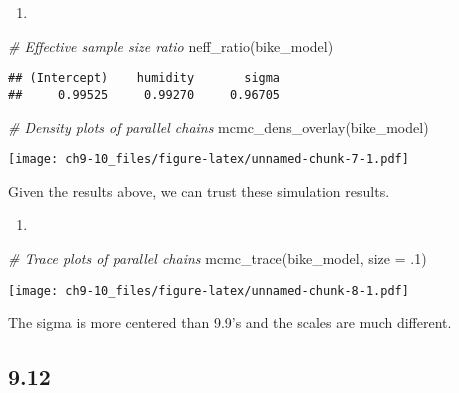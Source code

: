 \documentclass[
]{article}
\newenvironment{Shaded}{\begin{snugshade}}{\end{snugshade}}
\newcommand{\AttributeTok}[1]{\textcolor[rgb]{0.77,0.63,0.00}{#1}}
\newcommand{\CommentTok}[1]{\textcolor[rgb]{0.56,0.35,0.01}{\textit{#1}}}
\newcommand{\DecValTok}[1]{\textcolor[rgb]{0.00,0.00,0.81}{#1}}
\newcommand{\FunctionTok}[1]{\textcolor[rgb]{0.00,0.00,0.00}{#1}}
\newcommand{\NormalTok}[1]{#1}
\providecommand{\tightlist}{%
  \setlength{\itemsep}{0pt}\setlength{\parskip}{0pt}}
\begin{document}
\begin{enumerate}
\def\labelenumi{\alph{enumi}.}
\setcounter{enumi}{1}
\tightlist
\item
\end{enumerate}

\begin{Shaded}
\begin{Highlighting}[]
\CommentTok{\# Effective sample size ratio }
\FunctionTok{neff\_ratio}\NormalTok{(bike\_model)}
\end{Highlighting}
\end{Shaded}

\begin{verbatim}
## (Intercept)    humidity       sigma 
##     0.99525     0.99270     0.96705
\end{verbatim}

\begin{Shaded}
\begin{Highlighting}[]
\CommentTok{\# Density plots of parallel chains}
\FunctionTok{mcmc\_dens\_overlay}\NormalTok{(bike\_model)}
\end{Highlighting}
\end{Shaded}

\texttt{[image: ch9-10\_files/figure-latex/unnamed-chunk-7-1.pdf]}

Given the results above, we can trust these simulation results.

\begin{enumerate}
\def\labelenumi{\alph{enumi}.}
\setcounter{enumi}{2}
\tightlist
\item
\end{enumerate}

\begin{Shaded}
\begin{Highlighting}[]
\CommentTok{\# Trace plots of parallel chains}
\FunctionTok{mcmc\_trace}\NormalTok{(bike\_model, }\AttributeTok{size =}\NormalTok{ .}\DecValTok{1}\NormalTok{)}
\end{Highlighting}
\end{Shaded}

\texttt{[image: ch9-10\_files/figure-latex/unnamed-chunk-8-1.pdf]}

The sigma is more centered than 9.9's and the scales are much different.

\hypertarget{section-3}{%
\subsection{9.12}\label{section-3}}
\end{document}
